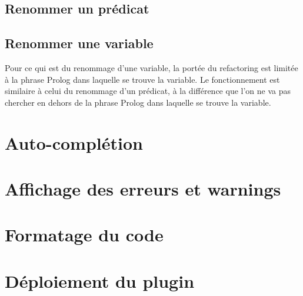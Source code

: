 \subsection{Renommer un prédicat}



\subsection{Renommer une variable}
\noindent Pour ce qui est du renommage d'une variable, la portée du refactoring est limitée à la phrase Prolog dans laquelle se trouve la variable.
\newdoubleline
Le fonctionnement est similaire à celui du renommage d'un prédicat, à la différence que l'on ne va pas chercher en dehors de la phrase Prolog dans laquelle se trouve la variable.

\section{Auto-complétion}


\section{Affichage des erreurs et warnings}


\section{Formatage du code}


\section{Déploiement du plugin}
